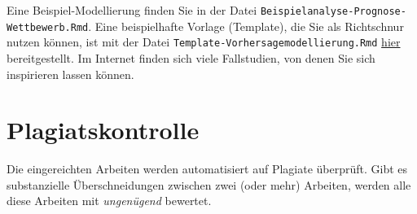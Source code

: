 \documentclass[
]{book}
\begin{document}
Eine Beispiel-Modellierung finden Sie in der Datei \texttt{Beispielanalyse-Prognose-Wettbewerb.Rmd}.
Eine beispielhafte Vorlage (Template), die Sie als Richtschnur nutzen können, ist mit der Datei \texttt{Template-Vorhersagemodellierung.Rmd} \href{https://github.com/sebastiansauer/vorhersagemodellierung/tree/main/Material}{hier} bereitgestellt.
Im Internet finden sich viele Fallstudien, von denen Sie sich inspirieren lassen können.

\hypertarget{plagiatskontrolle}{%
\section{Plagiatskontrolle}\label{plagiatskontrolle}}

Die eingereichten Arbeiten werden automatisiert auf Plagiate überprüft. Gibt es substanzielle Überschneidungen zwischen zwei (oder mehr) Arbeiten, werden alle diese Arbeiten mit \emph{ungenügend} bewertet.

  
\end{document}
